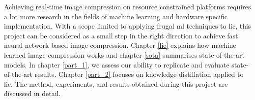 Achieving real-time image compression on resource constrained platforms requires a lot more research in the fields of machine learning and hardware specific implementation. With a scope limited to applying frugal \acrshort{ml} techniques to \acrshort{lic}, this project can be considered as a small step in the right direction to achieve fast neural network based image compression. Chapter \ref{lic} explains how machine learned image compression works and chapter \ref{sota} summarises state-of-the-art models. In chapter \ref{part_1}, we assess our ability to replicate and evaluate state-of-the-art results. Chapter \ref{part_2} focuses on knowledge distillation applied to \acrshort{lic}. The method, experiments, and results obtained during this project are discussed in detail.